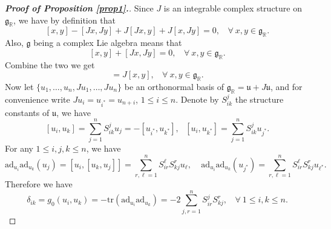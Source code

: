 \documentclass{amsart}
\begin{document}
{\begin{proof}[{\bf Proof of Proposition \ref{prop1}.}]
Since $J$ is an integrable complex structure on ${\mathfrak g_{\mathbb R}}$, we have by definition that
$$ [x,y]-[Jx,Jy] + J[Jx,y] + J[x,Jy] = 0, \ \ \ \ \forall \ x,y \in {\mathfrak g_{\mathbb R}}. $$
Also,  ${\mathfrak g}$ being a complex Lie algebra means that 
$$ [x,y] + [Jx,Jy] = 0,  \ \ \ \ \forall \ x,y \in {\mathfrak g_{\mathbb R}}. $$
Combine the two we get
\begin{equation*}
[Jx,y]=J[x,y], \ \ \ \ \forall \ x,y \in {\mathfrak g}_{\mathbb R}. 
\end{equation*}
Now let $\{ u_1, \ldots , u_n, Ju_1, \ldots , Ju_n\}$ be an orthonormal basis of ${\mathfrak g}_{\mathbb R} = {\mathfrak u}+ J{\mathfrak u}$, and for convenience write $Ju_i=u_{i^{\ast}}=u_{n+i}$, $1\leq i\leq n$. 
Denote by $S^j_{ik}$ the structure constants of ${\mathfrak u}$, we have
$$ [u_i,u_k] =\sum_{j=1}^n S^j_{ik} u_j = - [u_{i^{\ast}}, u_{k^{\ast}}], \ \ \ [u_i, u_{k^{\ast}}] = \sum_{j=1}^n S^j_{ik}u_{j^{\ast}}. $$
For any $1\leq i,j,k \leq n$, we have
$$ \mbox{ad}_{u_i}\mbox{ad}_{u_k}(u_j) = [u_i, [u_k, u_j]] = \sum_{r,\ell =1}^n  S^{\ell}_{ir} S^r_{kj} u_{\ell}, \ \ \ \ \ \mbox{ad}_{u_i} \mbox{ad}_{u_k}(u_{j^{\ast}}) = \sum_{r,\ell =1}^n  S^{\ell}_{ir} S^r_{kj} u_{\ell^{\ast}}. $$
Therefore we have 
\begin{equation} \label{eq:SS}
\delta_{ik}=g_0(u_i,u_k) = - \mbox{tr}(\mbox{ad}_{u_i}\mbox{ad}_{u_k}) = -2 \sum_{j,r=1}^n  S^{j}_{ir} S^r_{kj}, \
 \ \ \ \forall \ 1\leq i,k\leq n.
\end{equation}


\end{proof}}
\end{document}
